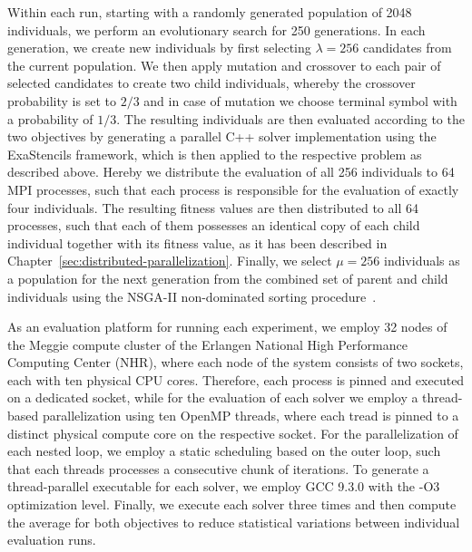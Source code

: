 Within each run, starting with a randomly generated population of 2048 individuals, we perform an evolutionary search for 250 generations.
In each generation, we create new individuals by first selecting $\lambda = 256$ candidates from the current population.
We then apply mutation and crossover to each pair of selected candidates to create two child individuals, whereby the crossover probability is set to $2/3$ and in case of mutation we choose terminal symbol with a probability of $1/3$.
The resulting individuals are then evaluated according to the two objectives by generating a parallel C++ solver implementation using the ExaStencils framework, which is then applied to the respective problem as described above.
Hereby we distribute the evaluation of all 256 individuals to 64 MPI processes, such that each process is responsible for the evaluation of exactly four individuals.
The resulting fitness values are then distributed to all 64 processes, such that each of them possesses an identical copy of each child individual together with its fitness value, as it has been described in Chapter~\ref{sec:distributed-parallelization}.
Finally, we select $\mu = 256$ individuals as a population for the next generation from the combined set of parent and child individuals using the NSGA-II non-dominated sorting procedure~\cite{deb2002fast}.

As an evaluation platform for running each experiment, we employ 32 nodes of the Meggie compute cluster of the Erlangen National High Performance Computing Center (NHR), where each node of the system consists of two sockets, each with ten physical CPU cores.
Therefore, each process is pinned and executed on a dedicated socket, while for the evaluation of each solver we employ a thread-based parallelization using ten OpenMP threads, where each tread is pinned to a distinct physical compute core on the respective socket.
For the parallelization of each nested loop, we employ a static scheduling based on the outer loop, such that each threads processes a consecutive chunk of iterations.
To generate a thread-parallel executable for each solver, we employ GCC 9.3.0 with the -O3 optimization level.
Finally, we execute each solver three times and then compute the average for both objectives to reduce statistical variations between individual evaluation runs.

